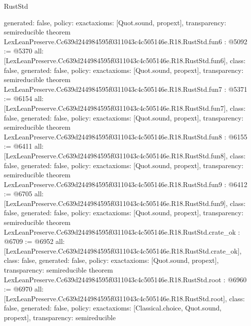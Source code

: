\begin{lexlean}{RustStd}
\begin{coremodule}
{  generated: false,
  policy: exact{axioms: [Quot.sound, propext]},
  transparency: semireducible
}
theorem LexLeanPreserve.Cc639d244984595f0311043c4c505146e.R18.RustStd.fun6 : @5092 := @5370 {
  all: [LexLeanPreserve.Cc639d244984595f0311043c4c505146e.R18.RustStd.fun6],
  class: false,
  generated: false,
  policy: exact{axioms: [Quot.sound, propext]},
  transparency: semireducible
}
theorem LexLeanPreserve.Cc639d244984595f0311043c4c505146e.R18.RustStd.fun7 : @5371 := @6154 {
  all: [LexLeanPreserve.Cc639d244984595f0311043c4c505146e.R18.RustStd.fun7],
  class: false,
  generated: false,
  policy: exact{axioms: [Quot.sound, propext]},
  transparency: semireducible
}
theorem LexLeanPreserve.Cc639d244984595f0311043c4c505146e.R18.RustStd.fun8 : @6155 := @6411 {
  all: [LexLeanPreserve.Cc639d244984595f0311043c4c505146e.R18.RustStd.fun8],
  class: false,
  generated: false,
  policy: exact{axioms: [Quot.sound, propext]},
  transparency: semireducible
}
theorem LexLeanPreserve.Cc639d244984595f0311043c4c505146e.R18.RustStd.fun9 : @6412 := @6705 {
  all: [LexLeanPreserve.Cc639d244984595f0311043c4c505146e.R18.RustStd.fun9],
  class: false,
  generated: false,
  policy: exact{axioms: [Quot.sound, propext]},
  transparency: semireducible
}
theorem LexLeanPreserve.Cc639d244984595f0311043c4c505146e.R18.RustStd.crate_ok : @6709 := @6952 {
  all: [LexLeanPreserve.Cc639d244984595f0311043c4c505146e.R18.RustStd.crate_ok],
  class: false,
  generated: false,
  policy: exact{axioms: [Quot.sound, propext]},
  transparency: semireducible
}
theorem LexLeanPreserve.Cc639d244984595f0311043c4c505146e.R18.RustStd.root : @6960 := @6970 {
  all: [LexLeanPreserve.Cc639d244984595f0311043c4c505146e.R18.RustStd.root],
  class: false,
  generated: false,
  policy: exact{axioms: [Classical.choice, Quot.sound, propext]},
  transparency: semireducible
}


\end{coremodule}
\end{lexlean}
